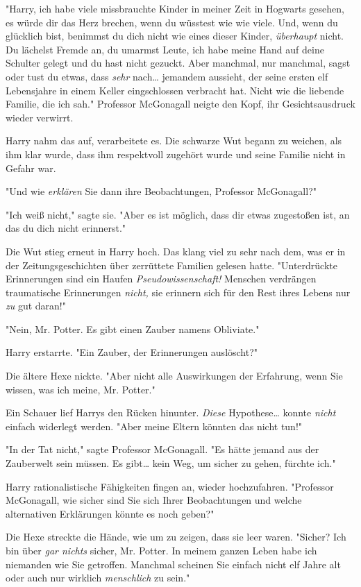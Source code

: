 {"Harry, ich habe viele missbrauchte Kinder in meiner Zeit in Hogwarts gesehen, es würde dir das Herz brechen, wenn du wüsstest wie wie viele. Und, wenn du glücklich bist, benimmst du dich nicht wie eines dieser Kinder, \emph{überhaupt} nicht. Du lächelst Fremde an, du umarmst Leute, ich habe meine Hand auf deine Schulter gelegt und du hast nicht gezuckt. Aber manchmal, nur manchmal, sagst oder tust du etwas, dass \emph{sehr} nach… jemandem aussieht, der seine ersten elf Lebensjahre in einem Keller eingschlossen verbracht hat. Nicht wie die liebende Familie, die ich sah." Professor McGonagall neigte den Kopf, ihr Gesichtsausdruck wieder verwirrt.

Harry nahm das auf, verarbeitete es. Die schwarze Wut begann zu weichen, als ihm klar wurde, dass ihm respektvoll zugehört wurde und seine Familie nicht in Gefahr war.

"Und wie \emph{erklären} Sie dann ihre Beobachtungen, Professor McGonagall?"

"Ich weiß nicht," sagte sie. "Aber es ist möglich, dass dir etwas zugestoßen ist, an das du dich nicht erinnerst."

Die Wut stieg erneut in Harry hoch. Das klang viel zu sehr nach dem, was er in der Zeitungsgeschichten über zerrüttete Familien gelesen hatte. "Unterdrückte Erinnerungen sind ein Haufen \emph{Pseudowissenschaft!} Menschen verdrängen traumatische Erinnerungen \emph{nicht,} sie erinnern sich für den Rest ihres Lebens nur \emph{zu} gut daran!"

"Nein, Mr. Potter. Es gibt einen Zauber namens Obliviate."

Harry erstarrte. "Ein Zauber, der Erinnerungen auslöscht?"

Die ältere Hexe nickte. "Aber nicht alle Auswirkungen der Erfahrung, wenn Sie wissen, was ich meine, Mr. Potter."

Ein Schauer lief Harrys den Rücken hinunter. \emph{Diese} Hypothese… konnte \emph{nicht} einfach widerlegt werden. "Aber meine Eltern könnten das nicht tun!"

"In der Tat nicht," sagte Professor McGonagall. "Es hätte jemand aus der Zauberwelt sein müssen. Es gibt… kein Weg, um sicher zu gehen, fürchte ich."

Harry rationalistische Fähigkeiten fingen an, wieder hochzufahren. "Professor McGonagall, wie sicher sind Sie sich Ihrer Beobachtungen und welche alternativen Erklärungen könnte es noch geben?"

Die Hexe streckte die Hände, wie um zu zeigen, dass sie leer waren. "Sicher? Ich bin über \emph{gar nichts} sicher, Mr. Potter. In meinem ganzen Leben habe ich niemanden wie Sie getroffen. Manchmal scheinen Sie einfach nicht elf Jahre alt oder auch nur wirklich \emph{menschlich} zu sein."

}
